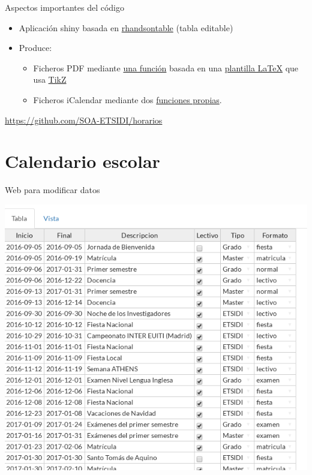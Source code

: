 \documentclass[spanish, xcolor={usenames,svgnames,dvipsnames}]{beamer}
\begin{document}
\begin{frame}[label={sec:org89554b7}]{Aspectos importantes del código}
\begin{block}{}
\begin{itemize}
\item Aplicación shiny basada en \href{http://jrowen.github.io/rhandsontable/}{rhandsontable} (tabla editable)
\item Produce:
\begin{itemize}
\item Ficheros PDF mediante \href{https://github.com/SOA-ETSIDI/horarios/blob/master/csv2tt.R}{una función} basada en una \href{https://github.com/SOA-ETSIDI/horarios/blob/master/timetable.tex}{plantilla \LaTeX{}} que usa \href{https://en.wikipedia.org/wiki/PGF/TikZ}{TikZ}
\item Ficheros iCalendar mediante dos \href{https://github.com/SOA-ETSIDI/misc/blob/master/funciones.R}{funciones propias}.
\end{itemize}
\end{itemize}
\end{block}
\begin{block}{}
\url{https://github.com/SOA-ETSIDI/horarios}
\end{block}
\end{frame}


\section{Calendario escolar}
\label{sec:orgb19c219}

\begin{frame}[label={sec:org41f8539}]{Web para modificar datos}
\begin{center}
\includegraphics[width=.9\linewidth]{images/formulario-calendario.png}
\end{center}
\end{frame}
\end{document}
